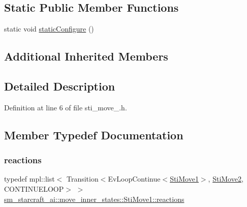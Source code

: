 \subsection*{Static Public Member Functions}
\begin{DoxyCompactItemize}
\item 
static void \hyperlink{structsm__starcraft__ai_1_1move__inner__states_1_1StiMove1_af5b082714bc05b79841e1b4b57a33c19}{static\+Configure} ()
\end{DoxyCompactItemize}
\subsection*{Additional Inherited Members}


\subsection{Detailed Description}


Definition at line 6 of file sti\+\_\+move\+\_.\+h.



\subsection{Member Typedef Documentation}
\mbox{\label{structsm__starcraft__ai_1_1move__inner__states_1_1StiMove1_a6229ca10912d8860ea23e26acc27b3df}} 
\subsubsection{\texorpdfstring{reactions}{reactions}}
{\footnotesize\ttfamily typedef mpl\+::list$<$ Transition$<$Ev\+Loop\+Continue$<$\hyperlink{structsm__starcraft__ai_1_1move__inner__states_1_1StiMove1}{Sti\+Move1}$>$, \hyperlink{structsm__starcraft__ai_1_1move__inner__states_1_1StiMove2}{Sti\+Move2}, C\+O\+N\+T\+I\+N\+U\+E\+L\+O\+OP$>$ $>$ \hyperlink{structsm__starcraft__ai_1_1move__inner__states_1_1StiMove1_a6229ca10912d8860ea23e26acc27b3df}{sm\+\_\+starcraft\+\_\+ai\+::move\+\_\+inner\+\_\+states\+::\+Sti\+Move1\+::reactions}}




